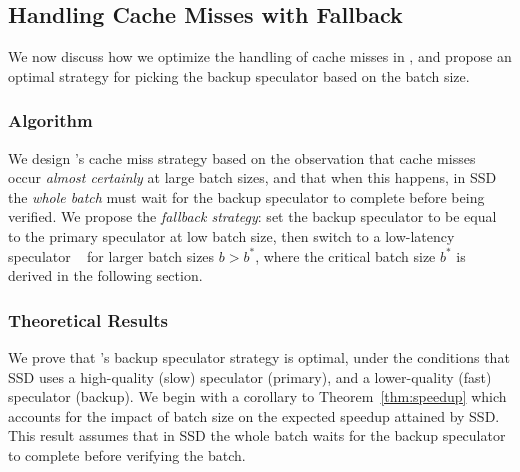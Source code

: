 \subsection{Handling Cache Misses with \Sys Fallback}
\label{sec:cache_misses}

We now discuss how we optimize the handling of cache misses in \Sys, and propose an optimal strategy for picking the backup speculator based on the batch size.

\subsubsection{Algorithm}
We design \Sys's cache miss strategy based on the observation that cache misses occur \textit{almost certainly} at large batch sizes, and that when this happens, in SSD the \textit{whole batch} must wait for the backup speculator to complete before being verified.
We propose the \textit{\Sys fallback strategy}:
set the backup speculator to be equal to the primary speculator at low batch size, then switch to a low-latency speculator ~\citep{suffixtree,infinigram,infini_mini} for larger batch sizes $b>b^*$, where the critical batch size $b^*$ is derived in the following section. 


\subsubsection{Theoretical Results}
We prove that \Sys's backup speculator strategy is optimal, under the conditions that SSD uses a high-quality (slow) speculator (primary), and a lower-quality (fast) speculator (backup). We begin with a corollary to Theorem~\ref{thm:speedup} which accounts for the impact of batch size on the expected speedup attained by SSD.
This result assumes that in SSD the whole batch waits for the backup speculator to complete before verifying the batch.

